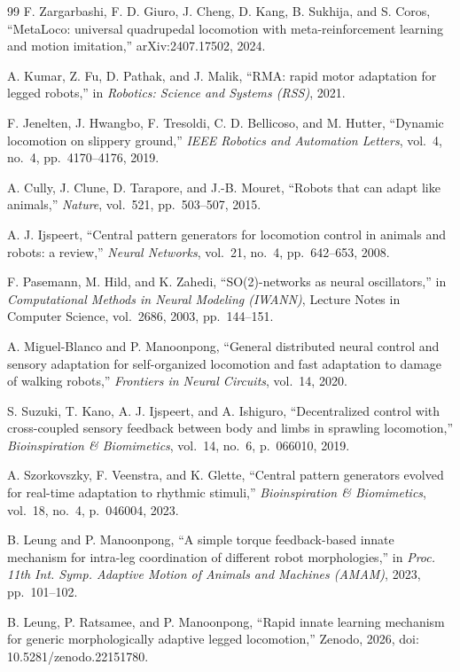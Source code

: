 \documentclass[a4paper, 10pt, conference]{ieeeconf}
\begin{document}
\begin{thebibliography}{99}
 F. Zargarbashi, F. D. Giuro, J. Cheng, D. Kang,
B. Sukhija, and S. Coros, ``MetaLoco: universal quadrupedal locomotion with
meta-reinforcement learning and motion imitation,'' arXiv:2407.17502, 2024.

 A. Kumar, Z. Fu, D. Pathak, and J. Malik, ``RMA: rapid motor
adaptation for legged robots,'' in \emph{Robotics: Science and Systems (RSS)},
2021.

 F. Jenelten, J. Hwangbo, F. Tresoldi, C. D. Bellicoso, and
M. Hutter, ``Dynamic locomotion on slippery ground,'' \emph{IEEE Robotics and
Automation Letters}, vol.~4, no.~4, pp.~4170--4176, 2019.

 A. Cully, J. Clune, D. Tarapore, and J.-B. Mouret, ``Robots
that can adapt like animals,'' \emph{Nature}, vol.~521, pp.~503--507, 2015.

 A. J. Ijspeert, ``Central pattern generators for
locomotion control in animals and robots: a review,'' \emph{Neural Networks},
vol.~21, no.~4, pp.~642--653, 2008.

 F. Pasemann, M. Hild, and K. Zahedi, ``SO(2)-networks as
neural oscillators,'' in \emph{Computational Methods in Neural Modeling (IWANN)},
Lecture Notes in Computer Science, vol.~2686, 2003, pp.~144--151.

 A. Miguel-Blanco and P. Manoonpong, ``General
distributed neural control and sensory adaptation for self-organized locomotion
and fast adaptation to damage of walking robots,'' \emph{Frontiers in Neural
Circuits}, vol.~14, 2020.

 S. Suzuki, T. Kano, A. J. Ijspeert, and A. Ishiguro,
``Decentralized control with cross-coupled sensory feedback between body and limbs
in sprawling locomotion,'' \emph{Bioinspiration \& Biomimetics}, vol.~14, no.~6,
p.~066010, 2019.

 A. Szorkovszky, F. Veenstra, and K. Glette, ``Central
pattern generators evolved for real-time adaptation to rhythmic stimuli,''
\emph{Bioinspiration \& Biomimetics}, vol.~18, no.~4, p.~046004, 2023.

 B. Leung and P. Manoonpong, ``A simple torque feedback-based
innate mechanism for intra-leg coordination of different robot morphologies,'' in
\emph{Proc. 11th Int. Symp. Adaptive Motion of Animals and Machines (AMAM)}, 2023,
pp.~101--102.

 B. Leung, P. Ratsamee, and P. Manoonpong, ``Rapid innate
learning mechanism for generic morphologically adaptive legged locomotion,''
Zenodo, 2026, doi: 10.5281/zenodo.22151780.


\end{thebibliography}
\end{document}
